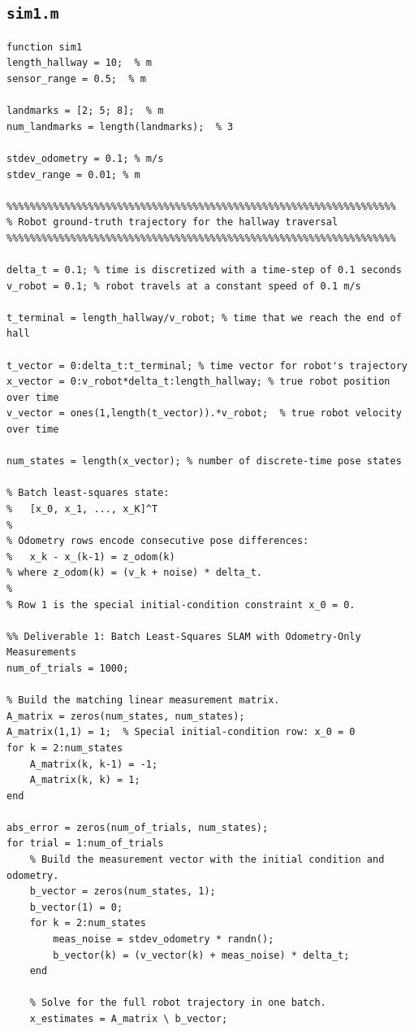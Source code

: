 \documentclass[11pt]{article}
\begin{document}
\subsection*{\texttt{sim1.m}}
\begin{lstlisting}[caption={sim1.m}, label={lst:sim1}]
function sim1
length_hallway = 10;  % m
sensor_range = 0.5;  % m

landmarks = [2; 5; 8];  % m
num_landmarks = length(landmarks);  % 3

stdev_odometry = 0.1; % m/s
stdev_range = 0.01; % m

%%%%%%%%%%%%%%%%%%%%%%%%%%%%%%%%%%%%%%%%%%%%%%%%%%%%%%%%%%%%%%%%%%%
% Robot ground-truth trajectory for the hallway traversal
%%%%%%%%%%%%%%%%%%%%%%%%%%%%%%%%%%%%%%%%%%%%%%%%%%%%%%%%%%%%%%%%%%%

delta_t = 0.1; % time is discretized with a time-step of 0.1 seconds
v_robot = 0.1; % robot travels at a constant speed of 0.1 m/s

t_terminal = length_hallway/v_robot; % time that we reach the end of hall

t_vector = 0:delta_t:t_terminal; % time vector for robot's trajectory
x_vector = 0:v_robot*delta_t:length_hallway; % true robot position over time
v_vector = ones(1,length(t_vector)).*v_robot;  % true robot velocity over time

num_states = length(x_vector); % number of discrete-time pose states

% Batch least-squares state:
%   [x_0, x_1, ..., x_K]^T
%
% Odometry rows encode consecutive pose differences:
%   x_k - x_(k-1) = z_odom(k)
% where z_odom(k) = (v_k + noise) * delta_t.
%
% Row 1 is the special initial-condition constraint x_0 = 0.

%% Deliverable 1: Batch Least-Squares SLAM with Odometry-Only Measurements
num_of_trials = 1000;

% Build the matching linear measurement matrix.
A_matrix = zeros(num_states, num_states);
A_matrix(1,1) = 1;  % Special initial-condition row: x_0 = 0
for k = 2:num_states
    A_matrix(k, k-1) = -1;
    A_matrix(k, k) = 1;
end

abs_error = zeros(num_of_trials, num_states);
for trial = 1:num_of_trials
    % Build the measurement vector with the initial condition and odometry.
    b_vector = zeros(num_states, 1);
    b_vector(1) = 0;
    for k = 2:num_states
        meas_noise = stdev_odometry * randn();
        b_vector(k) = (v_vector(k) + meas_noise) * delta_t;
    end

    % Solve for the full robot trajectory in one batch.
    x_estimates = A_matrix \ b_vector;


\end{lstlisting}
\end{document}
